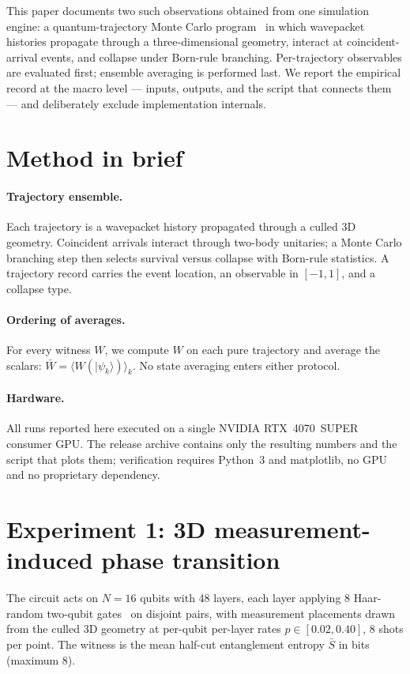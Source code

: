 \documentclass[aps,pra,preprint,superscriptaddress]{revtex4-2}
\begin{document}
This paper documents two such observations obtained from one simulation
engine: a quantum-trajectory Monte Carlo program~\cite{Carmichael1993,
DalibardCastinMolmer1992,PlenioKnight1998} in which wavepacket histories
propagate through a three-dimensional geometry, interact at coincident-arrival
events, and collapse under Born-rule branching.  Per-trajectory observables
are evaluated first; ensemble averaging is performed last.  We report the
empirical record at the macro level --- inputs, outputs, and the script that
connects them --- and deliberately exclude implementation internals.

\section{Method in brief}

\paragraph{Trajectory ensemble.}
Each trajectory is a wavepacket history propagated through a culled 3D
geometry.  Coincident arrivals interact through two-body unitaries; a Monte
Carlo branching step then selects survival versus collapse with Born-rule
statistics.  A trajectory record carries the event location, an observable in
$[-1,1]$, and a collapse type.

\paragraph{Ordering of averages.}
For every witness $W$, we compute $W$ on each pure trajectory and average the
scalars: $\bar W = \langle W(|\psi_k\rangle) \rangle_k$.  No state averaging
enters either protocol.

\paragraph{Hardware.}
All runs reported here executed on a single NVIDIA RTX~4070~SUPER consumer
GPU.  The release archive contains only the resulting numbers and the script
that plots them; verification requires Python~3 and matplotlib, no GPU and no
proprietary dependency.

\section{Experiment 1: 3D measurement-induced phase transition}

The circuit acts on $N=16$ qubits with 48 layers, each layer applying 8
Haar-random two-qubit gates~\cite{Mezzadri2007} on disjoint pairs, with
measurement placements drawn from the culled 3D geometry at per-qubit
per-layer rates $p \in [0.02,0.40]$, 8 shots per point.  The witness is the
mean half-cut entanglement entropy $\bar S$ in bits (maximum 8).
\end{document}
